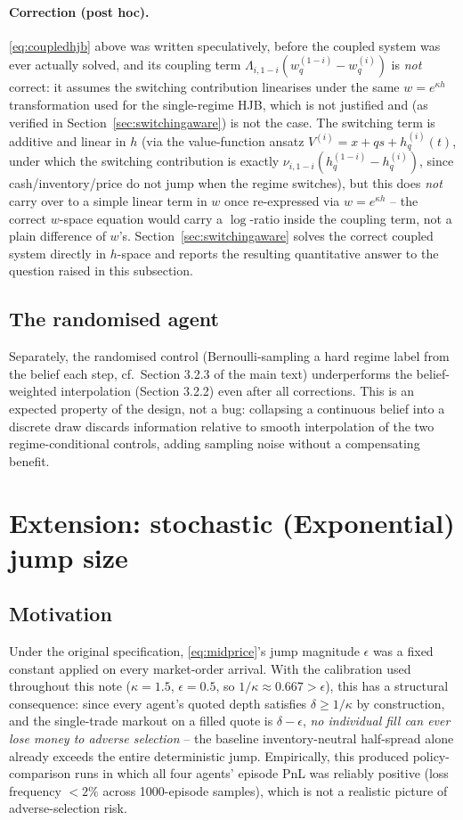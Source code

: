\documentclass[11pt]{article}
\begin{document}
\paragraph{Correction (post hoc).} \eqref{eq:coupledhjb} above was written speculatively, before the coupled system was ever actually solved, and its coupling term $\Lambda_{i,1-i}(w_q^{(1-i)}-w_q^{(i)})$ is \emph{not} correct: it assumes the switching contribution linearises under the same $w=e^{\kappa h}$ transformation used for the single-regime HJB, which is not justified and (as verified in Section~\ref{sec:switchingaware}) is not the case. The switching term is additive and linear in $h$ (via the value-function ansatz $V^{(i)}=x+qs+h_q^{(i)}(t)$, under which the switching contribution is exactly $\nu_{i,1-i}(h_q^{(1-i)}-h_q^{(i)})$, since cash/inventory/price do not jump when the regime switches), but this does \emph{not} carry over to a simple linear term in $w$ once re-expressed via $w=e^{\kappa h}$ -- the correct $w$-space equation would carry a $\log$-ratio inside the coupling term, not a plain difference of $w$'s. Section~\ref{sec:switchingaware} solves the correct coupled system directly in $h$-space and reports the resulting quantitative answer to the question raised in this subsection.

\subsection{The randomised agent}
Separately, the randomised control (Bernoulli-sampling a hard regime label from the belief each step, cf.\ Section 3.2.3 of the main text) underperforms the belief-weighted interpolation (Section 3.2.2) even after all corrections. This is an expected property of the design, not a bug: collapsing a continuous belief into a discrete draw discards information relative to smooth interpolation of the two regime-conditional controls, adding sampling noise without a compensating benefit.

\section{Extension: stochastic (Exponential) jump size}
\label{sec:expjump}

\subsection{Motivation}
Under the original specification, \eqref{eq:midprice}'s jump magnitude $\epsilon$ was a fixed constant applied on every market-order arrival. With the calibration used throughout this note ($\kappa=1.5$, $\epsilon=0.5$, so $1/\kappa \approx 0.667 > \epsilon$), this has a structural consequence: since every agent's quoted depth satisfies $\delta \ge 1/\kappa$ by construction, and the single-trade markout on a filled quote is $\delta - \epsilon$, \emph{no individual fill can ever lose money to adverse selection} -- the baseline inventory-neutral half-spread alone already exceeds the entire deterministic jump. Empirically, this produced policy-comparison runs in which all four agents' episode PnL was reliably positive (loss frequency $<2\%$ across 1000-episode samples), which is not a realistic picture of adverse-selection risk.
\end{document}
